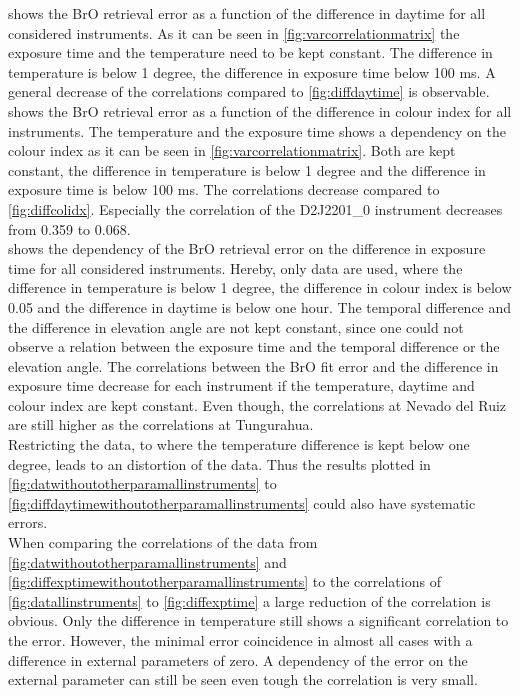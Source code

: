 \documentclass  [
  paper    = a4,
  BCOR     = 10mm,
  twoside,
  fontsize = 12pt,
  fleqn,
  toc      = bibnumbered,
  toc      = listofnumbered,
  numbers  = noendperiod,
  headings = normal,
  listof   = leveldown,
  version  = 3.03
]                                       {scrreprt}
\begin{document}
	 shows the BrO retrieval error as a function of the difference in daytime for all considered instruments. As it can be seen in \cref{fig:varcorrelationmatrix} the exposure time and the temperature need to be kept constant. The difference in temperature is below 1 degree, the difference in exposure time below 100 ms. A general decrease of the correlations compared to \cref{fig:diffdaytime} is observable.\\
	 shows the BrO retrieval error as a function of the difference in colour index for all instruments. The temperature and the exposure time shows a dependency on the colour index as it can be seen in \cref{fig:varcorrelationmatrix}. Both are kept constant, the difference in temperature is below 1 degree and the difference in exposure time is below 100 ms. The correlations decrease compared to \cref{fig:diffcolidx}. Especially the correlation of the D2J2201\_0 instrument decreases from 0.359 to 0.068.\\
	 shows the dependency of the BrO retrieval error on the difference in exposure time for all considered instruments. Hereby, only data are used, where the difference in temperature is below 1 degree, the difference in colour index is below 0.05 and the difference in daytime is below one hour. The temporal difference and the difference in elevation angle are not kept constant, since one could not observe a relation between the exposure time and the temporal difference or the elevation angle. The correlations between the BrO fit error and the difference in exposure time decrease for each instrument if the temperature, daytime and colour index are kept constant. Even though, the correlations at Nevado del Ruiz are still higher as the correlations at Tungurahua.\\
	Restricting the data, to where the temperature difference is kept below one degree, leads to an distortion of the data. Thus the results plotted in \cref{fig:datwithoutotherparamallinstruments} to \cref{fig:diffdaytimewithoutotherparamallinstruments} could also have systematic errors.\\
	When comparing the correlations of the data from \cref{fig:datwithoutotherparamallinstruments} and \cref{fig:diffexptimewithoutotherparamallinstruments}  to the correlations of 
	\cref{fig:datallinstruments} to \cref{fig:diffexptime} a large reduction of the correlation is obvious. Only the difference in temperature still shows a significant correlation to the   error. However, the minimal   error coincidence in almost all cases with a difference in external parameters of zero. A dependency of the   error on the external parameter can still be seen even tough the correlation is very small. \\
\end{document}
